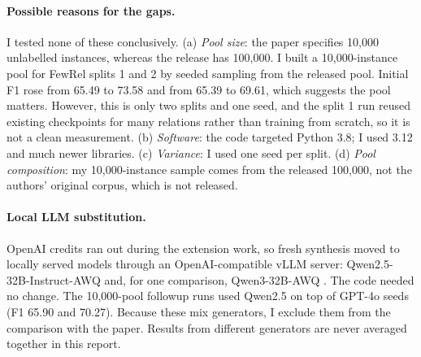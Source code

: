 \paragraph{Possible reasons for the gaps.} I tested none of these conclusively. (a) \emph{Pool size}: the paper specifies 10,000 unlabelled instances, whereas the release has 100,000. I built a 10,000-instance pool for FewRel splits 1 and 2 by seeded sampling from the released pool. Initial F1 rose from 65.49 to 73.58 and from 65.39 to 69.61, which suggests the pool matters. However, this is only two splits and one seed, and the split 1 run reused existing checkpoints for many relations rather than training from scratch, so it is not a clean measurement. (b) \emph{Software}: the code targeted Python 3.8; I used 3.12 and much newer libraries. (c) \emph{Variance}: I used one seed per split. (d) \emph{Pool composition}: my 10,000-instance sample comes from the released 100,000, not the authors' original corpus, which is not released.

\paragraph{Local LLM substitution.} OpenAI credits ran out during the extension work, so fresh synthesis moved to locally served models through an OpenAI-compatible vLLM server: Qwen2.5-32B-Instruct-AWQ \citep{qwen25} and, for one comparison, Qwen3-32B-AWQ \citep{qwen3}. The code needed no change. The 10,000-pool followup runs used Qwen2.5 on top of GPT-4o seeds (F1 65.90 and 70.27). Because these mix generators, I exclude them from the comparison with the paper. Results from different generators are never averaged together in this report.
